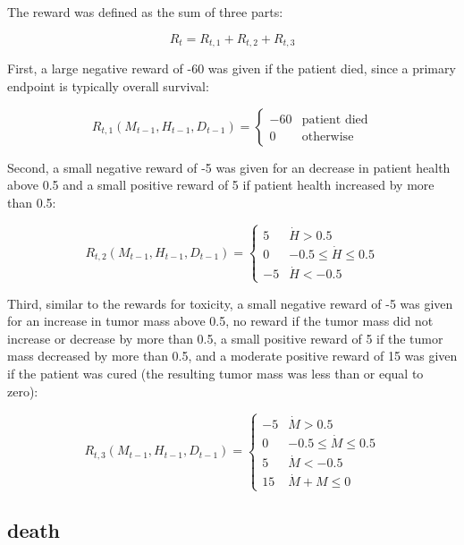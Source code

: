 \documentclass[12pt]{article}
\begin{document}


\subsection{} %
\label{sub:}

The reward was defined as the sum of three parts: 

\[
R_{t} = R_{t, 1} + R_{t, 2} + R_{t, 3}
\]

First, a large negative reward of -60 was given if the patient died, since a primary endpoint is typically overall survival:

\[
R_{t, 1}(M_{t-1}, H_{t-1}, D_{t-1}) = 
\begin{cases}
  -60 & \text{patient died} \\
  0 & \text{otherwise}
\end{cases}
\]

Second, a small negative reward of -5 was given for an decrease in patient health above 0.5 and a small positive reward of 5 if patient health increased by more than 0.5:

\[
R_{t, 2}(M_{t-1}, H_{t-1}, D_{t-1}) =  
\begin{cases}
  5 & \dot{H} > 0.5 \\
  0 & -0.5 \leq \dot{H} \leq 0.5 \\
  -5 & \dot{H} < -0.5
\end{cases}
\]

Third, similar to the rewards for toxicity, a small negative reward of -5 was given for an increase in tumor mass above 0.5, no reward if the tumor mass did not increase or decrease by more than 0.5, a small positive reward of 5 if the tumor mass decreased by more than 0.5, and a moderate positive reward of 15 was given if the patient was cured (the resulting tumor mass was less than or equal to zero):

\[
R_{t, 3}(M_{t-1}, H_{t-1}, D_{t-1}) = 
\begin{cases}
  -5 & \dot{M} > 0.5 \\
  0 & -0.5 \leq \dot{M} \leq 0.5 \\
  5 & \dot{M} < -0.5 \\
  15 & \dot{M} + M \leq 0
\end{cases}
\]


\subsection{death} %
\label{sub:death}
\end{document}
